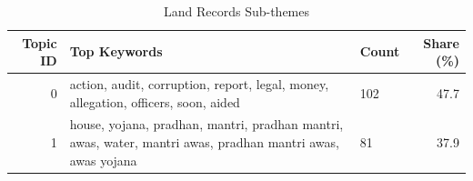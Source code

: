 \begin{table}[htbp]
\centering
\caption{Land Records Sub-themes}
\label{tab:topics_Land_Records}
\begin{tabular}{rlp{7cm}r}
\toprule
Topic ID & Top Keywords & Count & Share (\%) \\
\midrule
0 & action, audit, corruption, report, legal, money, allegation, officers, soon, aided & 102 & 47.7 \\
1 & house, yojana, pradhan, mantri, pradhan mantri, awas, water, mantri awas, pradhan mantri awas, awas yojana & 81 & 37.9 \\
\bottomrule
\end{tabular}
\end{table}